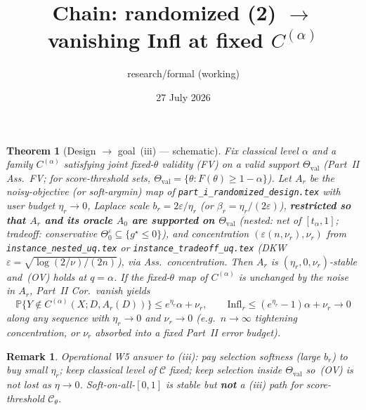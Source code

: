 \documentclass[11pt]{article}
\title{Chain: randomized (2) $\to$ vanishing Infl at fixed $C^{(\alpha)}$}
\author{research/formal (working)}
\date{27 July 2026}
\newtheorem{theorem}{Theorem}
\newtheorem{remark}{Remark}
\begin{document}
\maketitle

\begin{theorem}[Design $\to$ goal~(iii) --- schematic]
\label{thm:chain}
Fix classical level $\alpha$ and a family $C^{(\alpha)}$ satisfying joint fixed-$\theta$
validity (FV) on a valid support $\Theta_{\mathrm{val}}$
(Part~II Ass.~FV; for score-threshold sets, $\Theta_{\mathrm{val}}=\{\theta:F(\theta)\ge 1-\alpha\}$).
Let $A_r$ be the noisy-objective (or soft-argmin) map of
\texttt{part\_i\_randomized\_design.tex} with user budget $\eta_r\to 0$,
Laplace scale $b_r=2\varepsilon/\eta_r$ (or $\beta_r=\eta_r/(2\varepsilon)$),
\textbf{restricted so that $A_r$ and its oracle $A_0$ are supported on $\Theta_{\mathrm{val}}$}
(nested: net of $[t_\alpha,1]$; tradeoff: conservative $\Theta_0^\varepsilon\subseteq\{g^\star\le 0\}$),
and concentration $(\varepsilon(n,\nu_r),\nu_r)$ from
\texttt{instance\_nested\_uq.tex} or \texttt{instance\_tradeoff\_uq.tex}
(DKW $\varepsilon=\sqrt{\log(2/\nu)/(2n)}$), via Ass.\ concentration.
Then $A_r$ is $(\eta_r,0,\nu_r)$-stable and~(OV) holds at $q=\alpha$.
If the fixed-$\theta$ map of $C^{(\alpha)}$
is unchanged by the noise in $A_r$, Part~II Cor.\ vanish yields
\[
\mathbb{P}\bigl\{Y\notin C^{(\alpha)}(X;D,A_r(D))\bigr\}
\le e^{\eta_r}\alpha+\nu_r,
\qquad
\mathrm{Infl}_r\le (e^{\eta_r}-1)\alpha+\nu_r\to 0
\]
along any sequence with $\eta_r\to 0$ and $\nu_r\to 0$ (e.g.\ $n\to\infty$ tightening
concentration, or $\nu_r$ absorbed into a fixed Part~II error budget).
\end{theorem}

\begin{remark}
Operational W5 answer to (iii): pay selection softness (large $b_r$) to
buy small $\eta_r$; keep classical level of $\mathcal{C}$ fixed; keep selection inside
$\Theta_{\mathrm{val}}$ so~(OV) is not lost as $\eta\to 0$.
Soft-on-all-$[0,1]$ is stable but \textbf{not} a (iii) path for score-threshold $\mathcal{C}_\theta$.
\end{remark}
\end{document}
